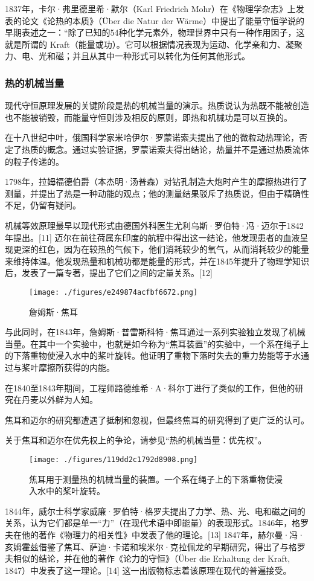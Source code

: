 1837年，卡尔·弗里德里希·默尔（Karl Friedrich Mohr）在《物理学杂志》上发表的论文《论热的本质》（Über die Natur der Wärme）中提出了能量守恒学说的早期表述之一：“除了已知的54种化学元素外，物理世界中只有一种作用因子，这就是所谓的 Kraft（能量或功）。它可以根据情况表现为运动、化学亲和力、凝聚力、电、光和磁；并且从其中一种形式可以转化为任何其他形式。
\subsubsection{热的机械当量}
现代守恒原理发展的关键阶段是热的机械当量的演示。热质说认为热既不能被创造也不能被销毁，而能量守恒则涉及相反的原则，即热和机械功是可以互换的。

在十八世纪中叶，俄国科学家米哈伊尔·罗蒙诺索夫提出了他的微粒动热理论，否定了热质的概念。通过实验证据，罗蒙诺索夫得出结论，热量并不是通过热质流体的粒子传递的。

1798年，拉姆福德伯爵（本杰明·汤普森）对钻孔制造大炮时产生的摩擦热进行了测量，并提出了热是一种动能的观点；他的测量结果驳斥了热质说，但由于精确性不足，仍留有疑问。

机械等效原理最早以现代形式由德国外科医生尤利乌斯·罗伯特·冯·迈尔于1842年提出。[11] 迈尔在前往荷属东印度的航程中得出这一结论，他发现患者的血液呈现更深的红色，因为在较热的气候下，他们消耗较少的氧气，从而消耗较少的能量来维持体温。他发现热量和机械功都是能量的形式，并在1845年提升了物理学知识后，发表了一篇专著，提出了它们之间的定量关系。[12]
\begin{figure}[ht]
\centering
\texttt{[image: ./figures/e249874acfbf6672.png]}
\caption{詹姆斯·焦耳} \label{fig_NLSH_6}
\end{figure}
与此同时，在1843年，詹姆斯·普雷斯科特·焦耳通过一系列实验独立发现了机械当量。在其中一个实验中，也就是如今称为“焦耳装置”的实验中，一个系在绳子上的下落重物使浸入水中的桨叶旋转。他证明了重物下落时失去的重力势能等于水通过与桨叶摩擦所获得的内能。

在1840至1843年期间，工程师路德维希·A·科尔丁进行了类似的工作，但他的研究在丹麦以外鲜为人知。

焦耳和迈尔的研究都遭遇了抵制和忽视，但最终焦耳的研究得到了更广泛的认可。

关于焦耳和迈尔在优先权上的争论，请参见“热的机械当量：优先权”。
\begin{figure}[ht]
\centering
\texttt{[image: ./figures/119dd2c1792d8908.png]}
\caption{焦耳用于测量热的机械当量的装置。一个系在绳子上的下落重物使浸入水中的桨叶旋转。} \label{fig_NLSH_7}
\end{figure}
1844年，威尔士科学家威廉·罗伯特·格罗夫提出了力学、热、光、电和磁之间的关系，认为它们都是单一“力”（在现代术语中即能量）的表现形式。1846年，格罗夫在他的著作《物理力的相关性》中发表了他的理论。[13] 1847年，赫尔曼·冯·亥姆霍兹借鉴了焦耳、萨迪·卡诺和埃米尔·克拉佩龙的早期研究，得出了与格罗夫相似的结论，并在他的著作《论力的守恒》（Über die Erhaltung der Kraft, 1847）中发表了这一理论。[14] 这一出版物标志着该原理在现代的普遍接受。

